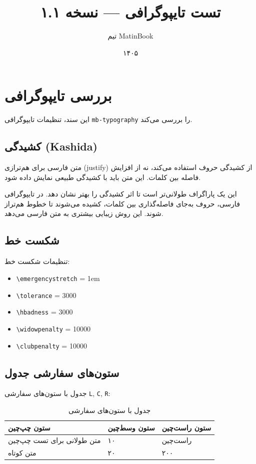 \documentclass{matinbook}
\title{تست تایپوگرافی — نسخه ۱.۱}
\author{تیم MatinBook}
\date{۱۴۰۵}
\begin{document}
\maketitle

\chapter{بررسی تایپوگرافی}
\label{chap:test-typography}

این سند، تنظیمات تایپوگرافی \texttt{mb-typography} را بررسی می‌کند.

\section{کشیدگی (Kashida)}
\label{sec:kashida}

متن فارسی برای هم‌ترازی (justify) از کشیدگی حروف استفاده می‌کند، نه از افزایش فاصله بین کلمات. این متن باید با کشیدگی طبیعی نمایش داده شود.

این یک پاراگراف طولانی‌تر است تا اثر کشیدگی را بهتر نشان دهد. در تایپوگرافی فارسی، حروف به‌جای فاصله‌گذاری بین کلمات، کشیده می‌شوند تا خطوط هم‌تراز شوند. این روش زیبایی بیشتری به متن فارسی می‌دهد.

\section{شکست خط}
\label{sec:line-break}

تنظیمات شکست خط:
\begin{itemize}
    \item \verb|\emergencystretch| = 1em
    \item \verb|\tolerance| = 3000
    \item \verb|\hbadness| = 3000
    \item \verb|\widowpenalty| = 10000
    \item \verb|\clubpenalty| = 10000
\end{itemize}

\section{ستون‌های سفارشی جدول}
\label{sec:custom-columns}

جدول با ستون‌های سفارشی \texttt{L}, \texttt{C}, \texttt{R}:

\begin{table}[h]
\centering
\caption{جدول با ستون‌های سفارشی}
\label{tab:typography-test}
\begin{tabular}{L{4cm} C{2cm} R{3cm}}
\toprule
\textbf{ستون چپ‌چین} & \textbf{ستون وسط‌چین} & \textbf{ستون راست‌چین} \\
\midrule
متن طولانی برای تست چپ‌چین & ۱۰ & راست‌چین \\
متن کوتاه & ۲۰ & ۲۰۰ \\
\bottomrule
\end{tabular}
\end{table}
\end{document}
